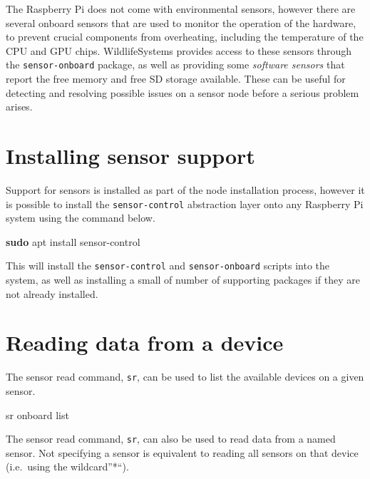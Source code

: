 \documentclass[
]{book}
\newenvironment{Shaded}{\begin{snugshade}}{\end{snugshade}}
\newcommand{\ExtensionTok}[1]{#1}
\newcommand{\FunctionTok}[1]{\textcolor[rgb]{0.13,0.29,0.53}{\textbf{#1}}}
\newcommand{\NormalTok}[1]{#1}
\begin{document}
The Raspberry Pi does not come with environmental sensors, however there are several onboard sensors that are used to monitor the operation of the hardware, to prevent crucial components from overheating, including the temperature of the CPU and GPU chips. WildlifeSystems provides access to these sensors through the \texttt{sensor-onboard} package, as well as providing some \emph{software sensors} that report the free memory and free SD storage available. These can be useful for detecting and resolving possible issues on a sensor node before a serious problem arises.

\section{Installing sensor support}\label{installing-sensor-support}

Support for sensors is installed as part of the node installation process, however it is possible to install the \texttt{sensor-control} abstraction layer onto any Raspberry Pi system using the command below.

\begin{Shaded}
\begin{Highlighting}[]
\FunctionTok{sudo}\NormalTok{ apt install sensor{-}control}
\end{Highlighting}
\end{Shaded}

This will install the \texttt{sensor-control} and \texttt{sensor-onboard} scripts into the system, as well as installing a small of number of supporting packages if they are not already installed.

\section{Reading data from a device}\label{reading-data-from-a-device}

The sensor read command, \texttt{sr}, can be used to list the available devices on a given sensor.

\begin{Shaded}
\begin{Highlighting}[]
\ExtensionTok{sr}\NormalTok{ onboard list}
\end{Highlighting}
\end{Shaded}

The sensor read command, \texttt{sr}, can also be used to read data from a named sensor. Not specifying a sensor is equivalent to reading all sensors on that device (i.e.~using the wildcard''*``).
\end{document}
